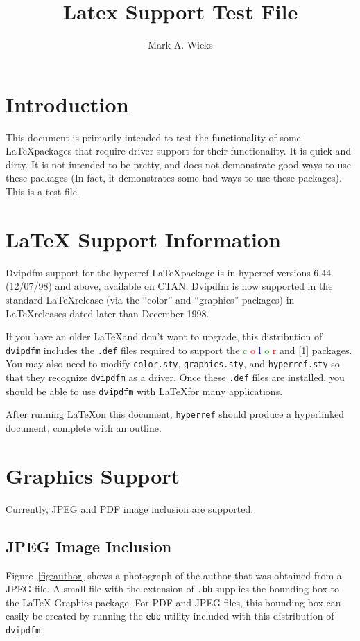 \documentclass[dvipdfm]{article}
\title{\color{blue}Latex Support Test File}
\author{\color{green}Mark A. Wicks}
\begin{document}
\maketitle
\section{Introduction}
This document is primarily intended
to test the functionality
of some \LaTeX\space packages that require
driver support for their functionality.
It is quick-and-dirty.
It is not intended to be pretty, and
does not demonstrate good ways to use these packages
(In fact, it demonstrates some bad ways to use these packages).
This is a test file.

\section{LaTeX Support Information}
Dvipdfm support for the hyperref \LaTeX\space package is 
in hyperref versions 6.44 (12/07/98) and above, available on CTAN.
Dvipdfm is now supported in the
standard \LaTeX\space release (via the ``color'' and ``graphics'' packages) in
\LaTeX\space releases dated later than December 1998.

If you have an older LaTeX\space and don't want to upgrade,
this distribution of {\tt dvipdfm} includes
the {\tt .def} files required to support
the
\textcolor{green}{c}%
\textcolor{red}{o}%
\textcolor{blue}{l}%
\textcolor{green}{o}%
\textcolor{red}{r}
and
\scalebox{1.3}[1]{}
packages.
You may also need to modify {\tt color.sty}, {\tt graphics.sty},
and {\tt hyperref.sty} so that they
recognize {\tt dvipdfm} as a driver.
Once these {\tt .def} files are installed,
you should be able to use {\tt dvipdfm}
with \LaTeX\space for many applications.

After running \LaTeX\space on this
document, {\tt hyperref}
should produce a hyperlinked
document, complete with an outline.

\newpage
\section{Graphics Support}
Currently, JPEG and PDF image
inclusion are supported.

\subsection{JPEG Image Inclusion}
Figure~\ref{fig:author}
shows a photograph of the author
that was obtained from a JPEG file.
A small file with the extension of {\tt .bb}
supplies the bounding box to the \LaTeX\space
Graphics package.  For PDF and JPEG files,
this bounding box can easily be created by running
the {\tt ebb} utility included with this
distribution of {\tt dvipdfm}.
\end{document}
